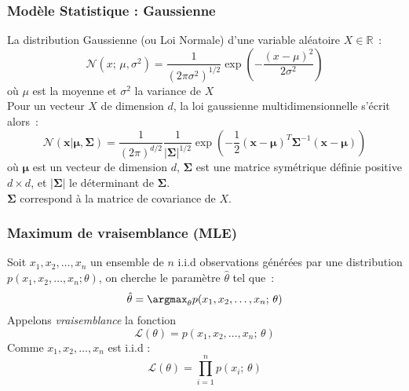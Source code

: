 
\begin{frame}
  \frametitle{Modèle Statistique : Gaussienne}
  La distribution Gaussienne (ou Loi Normale) d'une variable aléatoire $X \in \mathbb{R}$~:
    \[
    \mathcal{N}(x; \, \mu,\sigma^2)=\frac{1}{(2\pi\sigma^2)^{1/2}}\exp\left(-\frac{(x-\mu)^2}{2\sigma^2}\right)
    \]
    où $\mu$ est la moyenne et $\sigma^2$ la variance de $X$ \\
    \newline
    Pour un vecteur $X$ de dimension $d$, la loi gaussienne multidimensionnelle s'écrit alors~:
    \[
    \mathcal{N}(\mathbf{x}|\bm{\mu},\bm{\Sigma})=\frac{1}{(2\pi)^{d/2}}\frac{1}{|\bm{\Sigma}|^{1/2}}\exp\left(-\frac{1}{2}(\mathbf{x}-\bm{\mu})^T\bm{\Sigma}^{-1}(\mathbf{x}-\bm{\mu})\right)
    \]
    où $\bm{\mu}$ est un vecteur de dimension $d$, $\bm{\Sigma}$ est une matrice symétrique définie positive $d\times d$, et $|\bm{\Sigma}|$ le déterminant de $\bm{\Sigma}$. \\
    $\bm{\Sigma}$ correspond à la matrice de covariance de $X$.
\end{frame}

\begin{frame}
  \frametitle{Maximum de vraisemblance (MLE)}
  Soit $x_1,x_2,\ldots,x_n$ un ensemble de $n$ i.i.d observations générées par une distribution $p(x_1,x_2,\ldots,x_n;\theta)$, on cherche le paramètre $\hat{\theta}$ tel que~:
  $$\hat{\theta} = \argmax_\theta p(x_1,x_2,\ldots,x_n; \, \theta)$$
  Appelons \textit{vraisemblance} la fonction
  $$\mathcal{L}(\theta) = p(x_1,x_2,\ldots,x_n; \, \theta)$$
  Comme $x_1,x_2,\ldots,x_n$ est i.i.d :
  $$\mathcal{L}(\theta) = \prod_{i=1}^n p(x_i; \, \theta)$$
\end{frame}

